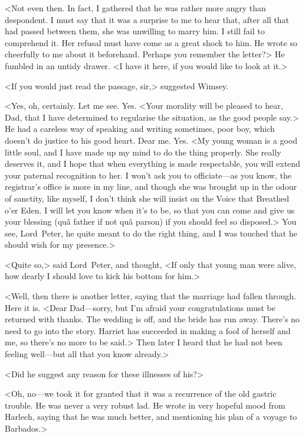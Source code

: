 <Not even then. In fact, I gathered that he was rather more angry than despondent. I must say that it was a surprise to me to hear that, after all that had passed between them, she was unwilling to marry him. I still fail to comprehend it. Her refusal must have come as a great shock to him. He wrote so cheerfully to me about it beforehand. Perhaps you remember the letter?> He fumbled in an untidy drawer. <I have it here, if you would like to look at it.>

<If you would just read the passage, sir,> suggested Wimsey.

<Yes, oh, certainly. Let me see. Yes. <Your morality will be pleased to hear, Dad, that I have determined to regularise the situation, as the good people say.> He had a careless way of speaking and writing sometimes, poor boy, which doesn't do justice to his good heart. Dear me. Yes. <My young woman is a good little soul, and I have made up my mind to do the thing properly. She really deserves it, and I hope that when everything is made respectable, you will extend your paternal recognition to her. I won't ask you to officiate—as you know, the registrar's office is more in my line, and though she was brought up in the odour of sanctity, like myself, I don't think she will insist on the Voice that Breathed o'er Eden. I will let you know when it's to be, so that you can come and give us your blessing (quâ father if not quâ parson) if you should feel so disposed.> You see, Lord~Peter, he quite meant to do the right thing, and I was touched that he should wish for my presence.>

<Quite so,> said Lord~Peter, and thought, <If only that young man were alive, how dearly I should love to kick his bottom for him.>

<Well, then there is another letter, saying that the marriage had fallen through. Here it is. <Dear Dad—sorry, but I'm afraid your congratulations must be returned with thanks. The wedding is off, and the bride has run away. There's no need to go into the story. Harriet has succeeded in making a fool of herself and me, so there's no more to be said.> Then later I heard that he had not been feeling well—but all that you know already.>

<Did he suggest any reason for these illnesses of his?>

<Oh, no—we took it for granted that it was a recurrence of the old gastric trouble. He was never a very robust lad. He wrote in very hopeful mood from Harlech, saying that he was much better, and mentioning his plan of a voyage to Barbados.>

